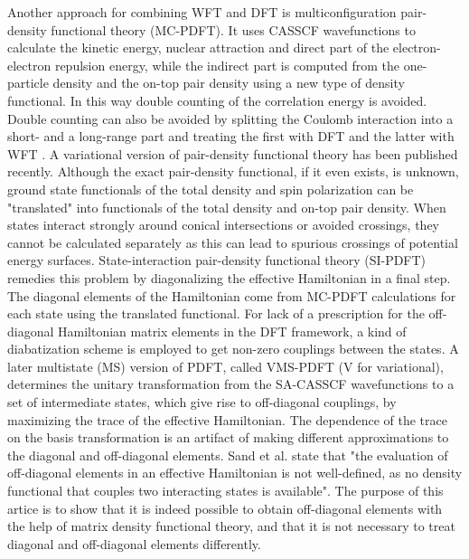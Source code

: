 \documentclass[journal=jpclcd,manuscript=letter]{achemso}
\begin{document}
Another approach for combining WFT and DFT is multiconfiguration pair-density functional theory (MC-PDFT). \cite{LiManni2014}
It uses CASSCF wavefunctions to calculate the kinetic energy, nuclear attraction and direct part of the electron-electron
repulsion energy, while the indirect part is computed from the one-particle density and the on-top pair density using
a new type of density functional. In this way double counting of the correlation energy is avoided.
Double counting can also be avoided by splitting the Coulomb interaction into a short- and a long-range part and
treating the first with DFT and the latter with WFT \cite{Leininger1997combining}.
A variational version of pair-density functional theory has been published recently. \cite{Scott2024}
Although the exact pair-density functional,
if it even exists, is unknown, ground state functionals of the total density and spin polarization can be "translated"
into functionals of the total density and on-top pair density. \cite{LiManni2014}
When states interact strongly around conical intersections or avoided crossings, they cannot be calculated separately as
this can lead to spurious crossings of potential energy surfaces. \cite{Sand2018state}
State-interaction pair-density functional theory (SI-PDFT)
\cite{Sand2018state} remedies this problem by diagonalizing the effective Hamiltonian in a final step.
The diagonal elements of the Hamiltonian come from 
MC-PDFT calculations for each state using the translated functional. 
For lack of a prescription for the off-diagonal Hamiltonian matrix elements in the DFT framework, a kind of diabatization
scheme is employed to get non-zero couplings between the states. \cite{Sand2018state}
A later multistate (MS) version of PDFT, called VMS-PDFT (V for variational), determines the unitary transformation
from the SA-CASSCF wavefunctions to a set of intermediate states, which give rise to off-diagonal couplings,
by maximizing the trace of the effective Hamiltonian. \cite{Bao2020multi} The dependence of the trace on the basis transformation
is an artifact of making different approximations to the diagonal and off-diagonal elements.
Sand et al. state that "the evaluation of off-diagonal elements in an effective Hamiltonian is not well-defined,
as no density functional that couples two interacting states is available". \cite{Sand2018state}
The purpose of this artice is to show
that it is indeed possible to obtain off-diagonal elements with the help of
matrix density functional theory, and that it is not necessary to treat diagonal and off-diagonal elements differently.
\end{document}
